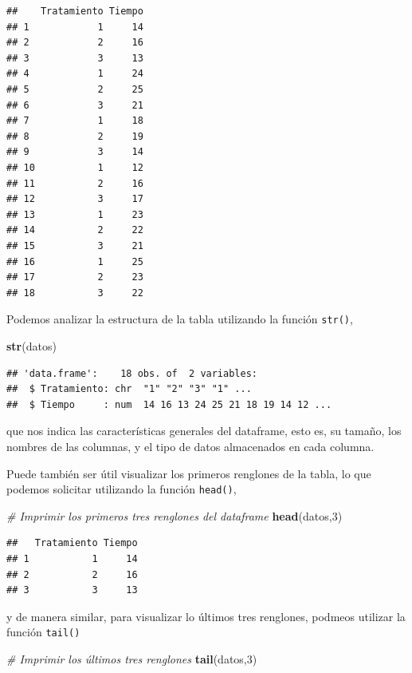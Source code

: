\documentclass[
]{book}
\newenvironment{Shaded}{\begin{snugshade}}{\end{snugshade}}
\newcommand{\CommentTok}[1]{\textcolor[rgb]{0.56,0.35,0.01}{\textit{#1}}}
\newcommand{\DecValTok}[1]{\textcolor[rgb]{0.00,0.00,0.81}{#1}}
\newcommand{\FunctionTok}[1]{\textcolor[rgb]{0.13,0.29,0.53}{\textbf{#1}}}
\newcommand{\NormalTok}[1]{#1}
\begin{document}
\begin{verbatim}
##    Tratamiento Tiempo
## 1            1     14
## 2            2     16
## 3            3     13
## 4            1     24
## 5            2     25
## 6            3     21
## 7            1     18
## 8            2     19
## 9            3     14
## 10           1     12
## 11           2     16
## 12           3     17
## 13           1     23
## 14           2     22
## 15           3     21
## 16           1     25
## 17           2     23
## 18           3     22
\end{verbatim}

Podemos analizar la estructura de la tabla utilizando la función \texttt{str()},

\begin{Shaded}
\begin{Highlighting}[]
\FunctionTok{str}\NormalTok{(datos)}
\end{Highlighting}
\end{Shaded}

\begin{verbatim}
## 'data.frame':    18 obs. of  2 variables:
##  $ Tratamiento: chr  "1" "2" "3" "1" ...
##  $ Tiempo     : num  14 16 13 24 25 21 18 19 14 12 ...
\end{verbatim}

que nos indica las características generales del dataframe, esto es, su tamaño, los nombres de las columnas, y el tipo de datos almacenados en cada columna.

Puede también ser útil visualizar los primeros renglones de la tabla, lo que podemos solicitar utilizando la función \texttt{head()},

\begin{Shaded}
\begin{Highlighting}[]
\CommentTok{\# Imprimir los primeros tres renglones del dataframe}
\FunctionTok{head}\NormalTok{(datos,}\DecValTok{3}\NormalTok{)}
\end{Highlighting}
\end{Shaded}

\begin{verbatim}
##   Tratamiento Tiempo
## 1           1     14
## 2           2     16
## 3           3     13
\end{verbatim}

y de manera similar, para visualizar lo últimos tres renglones, podmeos utilizar la función \texttt{tail()}

\begin{Shaded}
\begin{Highlighting}[]
\CommentTok{\# Imprimir los últimos tres renglones}
\FunctionTok{tail}\NormalTok{(datos,}\DecValTok{3}\NormalTok{)}
\end{Highlighting}
\end{Shaded}
\end{document}
